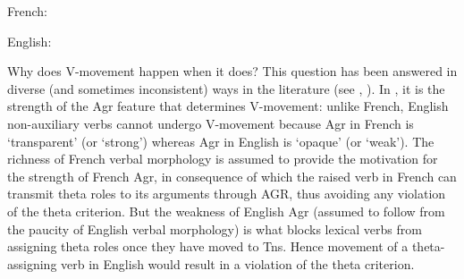 \documentclass[output=paper]{langsci/langscibook}
\begin{document}
\begin{exe}
\ex \label{8}\begin{xlist}
\ex French:

\ex English:
\end{xlist} \end{exe}




\noindent Why does V-movement happen when it does? This question
 has been
answered in diverse (and sometimes inconsistent) ways in
 the literature
(see \citet{Pollock:89,Pollock:94,Pollock:97a,Pollock:97b}, \citet{Vikner:94,Vikner:97}). In \citet{Pollock:89},
it is the strength of the Agr feature that
 determines V-movement: unlike
French, English non-auxiliary verbs
 cannot undergo V-movement because Agr in
French is `transparent'
 (or `strong') whereas Agr in English is `opaque' (or
`weak'). The
 richness of French verbal morphology is assumed to provide
the
 motivation for the strength of French Agr, in consequence of which the
raised verb in French can transmit theta roles to its
 arguments through AGR,
thus avoiding any violation of the theta
 criterion.  But the weakness of
English Agr (assumed to follow
 from the paucity of English verbal
morphology) is what blocks
 lexical verbs from assigning theta roles once
they have moved to
 Tns. Hence movement of a theta-assigning verb in English
would
 result in a violation of the theta criterion.
\end{document}
